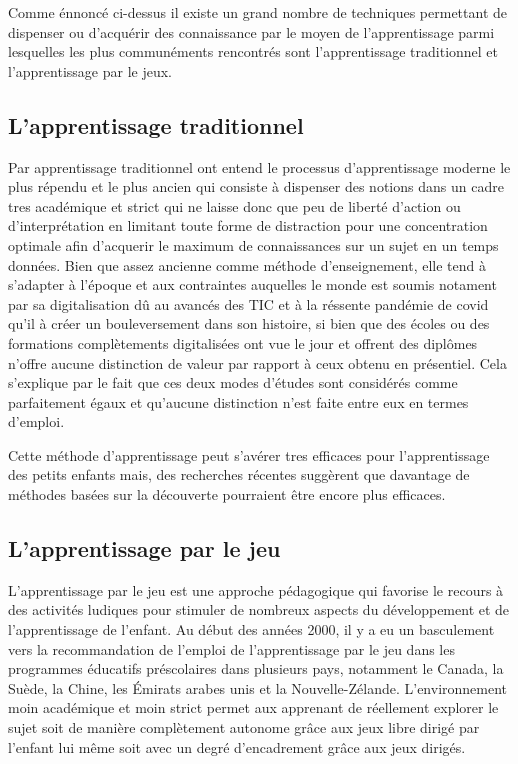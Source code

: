 Comme énnoncé ci-dessus il existe un grand nombre de techniques permettant de dispenser ou d'acquérir des connaissance par le moyen de l'apprentissage parmi lesquelles les
plus communéments rencontrés sont l'apprentissage traditionnel et l'apprentissage par le jeux.

\subsection{L'apprentissage traditionnel}

Par apprentissage traditionnel ont entend le processus d'apprentissage moderne le plus répendu et le plus ancien
qui consiste à dispenser des notions dans un cadre tres académique et strict qui ne laisse donc que peu de liberté
d'action ou d'interprétation en limitant toute forme de distraction pour une concentration optimale afin
d'acquerir le maximum de connaissances sur un sujet en un temps données. Bien que assez ancienne comme méthode d'enseignement, elle
tend à s'adapter à l'époque et aux contraintes auquelles le monde est soumis notament par sa digitalisation dû au avancés des TIC
et à la réssente pandémie de covid qu'il à créer un bouleversement dans son histoire, si bien que des écoles ou des formations
complètements digitalisées ont vue le jour et offrent des diplômes n'offre aucune distinction de valeur par rapport à ceux obtenu en présentiel.
Cela s'explique par le fait que ces deux modes d'études sont considérés comme parfaitement égaux et qu'aucune distinction n'est faite entre eux en termes d'emploi\cite{radovic2010advantages}.

Cette méthode d'apprentissage peut s'avérer tres efficaces pour l'apprentissage des petits enfants mais, des recherches récentes suggèrent que davantage de méthodes basées sur la découverte pourraient être encore plus efficaces.\cite{Weisberg2018GuidedPlay}

\subsection{L'apprentissage par le jeu}

L'apprentissage par le jeu est une approche pédagogique qui favorise le recours à des activités
ludiques pour stimuler de nombreux aspects du développement et de l'apprentissage de l'enfant\cite{AngelaPyle2018Apprentissage}.
Au début des années 2000, il y a eu un basculement vers la recommandation de l’emploi de
l’apprentissage par le jeu dans les programmes éducatifs préscolaires dans plusieurs pays,
notamment le Canada,\cite{whitebread2009play}
la Suède,\cite{Daubert2018Play}
la Chine,\cite{pyle2017continuum}
les Émirats arabes unis\cite{Hassinger2018Playing}
et la Nouvelle-Zélande\cite{Daubert2018Play}. L'environnement moin académique et moin strict permet aux apprenant de réellement explorer
le sujet soit de manière complètement autonome grâce aux jeux libre\cite{Berk2018Role} dirigé par l'enfant lui même soit avec un degré d'encadrement grâce aux jeux dirigés\cite{Bergen2018Cognitive}.

